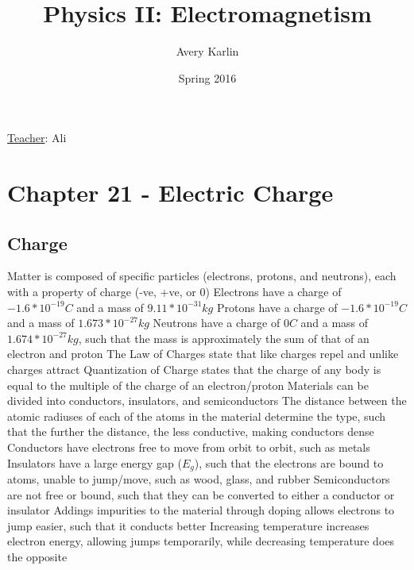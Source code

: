 \documentclass[11 pt, twoside]{article}
\newenvironment{outline*}
{
	\begin{outline}[enumerate]
	}
	{\end{outline}
}
\begin{document}
\title{Physics II: Electromagnetism}
\author{Avery Karlin}
\date{Spring 2016}
\newcommand{\teacher}{Ali}

\maketitle
\newpage
\hypertarget{content}{\tableofcontents}
\vspace{11pt}
\noindent
\underline{Teacher}: \teacher
\newpage

\section{Chapter 21 - Electric Charge}
\subsection{Charge}
\begin{outline*}
\1 Matter is composed of specific particles (electrons, protons, and neutrons), each with a property of charge (-ve, +ve, or 0)
\2 Electrons have a charge of $-1.6*10^{-19} C$ and a mass of $9.11*10^{-31} kg$
\2 Protons have a charge of $-1.6*10^{-19} C$ and a mass of $1.673*10^{-27} kg$
\2 Neutrons have a charge of $0 C$ and a mass of $1.674*10^{-27} kg$, such that the mass is approximately the sum of that of an electron and proton
\1 The Law of Charges state that like charges repel and unlike charges attract
\1 Quantization of Charge states that the charge of any body is equal to the multiple of the charge of an electron/proton
\1 Materials can be divided into conductors, insulators, and semiconductors
\2 The distance between the atomic radiuses of each of the atoms in the material determine the type, such that the further the distance, the less conductive, making conductors dense
\2 Conductors have electrons free to move from orbit to orbit, such as metals
\2 Insulators have a large energy gap ($E_g$), such that the electrons are bound to atoms, unable to jump/move, such as wood, glass, and rubber
\2 Semiconductors are not free or bound, such that they can be converted to either a conductor or insulator
\3 Addings impurities to the material through doping allows electrons to jump easier, such that it conducts better
\3 Increasing temperature increases electron energy, allowing jumps temporarily, while decreasing temperature does the opposite
\end{outline*}
\end{document}
